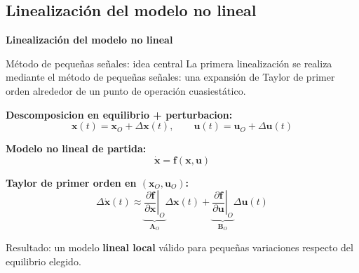 \documentclass[aspectratio=169,t]{beamer}
\newcommand{\sectionslide}[1]{%
  \begin{frame}[plain]
    \vfill
    \centering
    {\Huge\bfseries\color{uncBlue} #1\par}
    \vfill
  \end{frame}
}
\begin{document}
\subsection{Linealización del modelo no lineal}
\sectionslide{Linealización del modelo no lineal}

\begin{frame}{Método de pequeñas señales: idea central}
{\small\color{uncGray}La primera linealización se realiza mediante el método de pequeñas señales: una expansión de Taylor de primer orden alrededor de un punto de operación cuasiestático.}\par
\vspace{3mm}

\textbf{Descomposicion en equilibrio + perturbacion:}
\begin{equation*}
\bm{x}(t)=\bm{x}_O+\Delta\bm{x}(t),
\qquad
\bm{u}(t)=\bm{u}_O+\Delta\bm{u}(t)
\end{equation*}

\textbf{Modelo no lineal de partida:}
\begin{equation*}
\dot{\bm{x}}=\bm{f}(\bm{x},\bm{u})
\end{equation*}

\textbf{Taylor de primer orden en $(\bm{x}_O,\bm{u}_O)$:}
\begin{equation*}
\Delta\dot{\bm{x}}(t)\approx
\underbrace{\left.\frac{\partial \bm{f}}{\partial \bm{x}}\right|_O}_{\bm{A}_O}
\Delta\bm{x}(t)+
\underbrace{\left.\frac{\partial \bm{f}}{\partial \bm{u}}\right|_O}_{\bm{B}_O}
\Delta\bm{u}(t)
\end{equation*}

{\small Resultado: un modelo \textbf{lineal local} válido para pequeñas variaciones respecto del equilibrio elegido.}
\end{frame}
\end{document}
